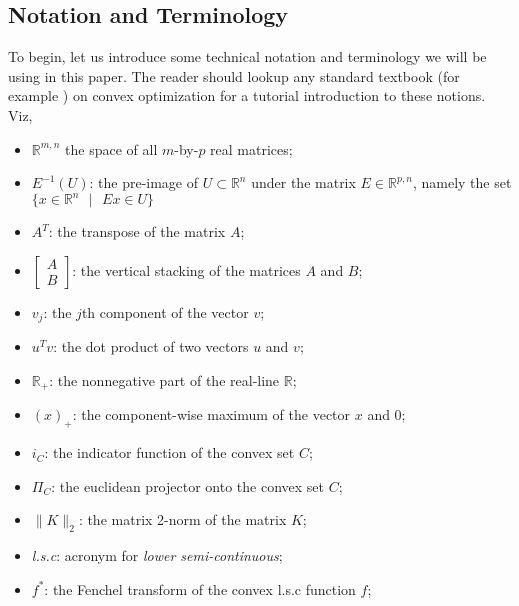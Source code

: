 \documentclass[a4paper,10pt,journal]{IEEEtran}
\begin{document}
\subsection{Notation and Terminology}
To begin, let us introduce some technical notation and terminology we will be using in this paper. The reader should lookup any standard textbook
(for example \cite{boyd2004}) on convex optimization for a tutorial introduction to these notions. Viz,
\begin{itemize}
\item $\mathbb{R}^{m, n}$ \quad the space of all $m$-by-$p$ real matrices;
\item $E^{-1}(U)$: \quad the pre-image of $U \subset \mathbb{R}^n$ under the matrix $E \in \mathbb{R}^{p,n}$,
namely the set $\{x \in \mathbb{R}^n\text{ }| \text{ }Ex \in U\}$
\item $A^T$: \quad the transpose of the matrix $A$;
\item $\begin{bmatrix}A\\B\end{bmatrix}$: \quad the vertical stacking of the matrices $A$ and $B$;
\item $v_j$: \quad the $j$th component of the vector $v$;
\item $u^Tv$: \quad the dot product of two vectors $u$ and $v$;
\item $\mathbb{R}_+$: \quad the nonnegative part of the real-line $\mathbb{R}$;
\item $(x)_+$: \quad the component-wise maximum of the vector $x$ and 0;
\item $i_C$: \quad the indicator function of the convex set $C$;
\item $\Pi_C$: \quad the euclidean projector onto the convex set $C$;
\item $\|K\|_2$: \quad the matrix 2-norm of the matrix $K$;
\item \textit{l.s.c}: \quad acronym for \textit{lower semi-continuous};
\item $f^*$: \quad the Fenchel transform of the convex l.s.c function $f$;
\end{itemize}
\end{document}

